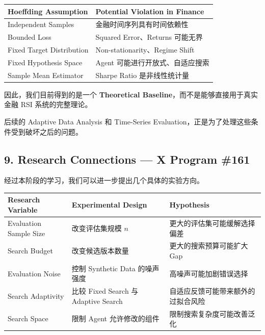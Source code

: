 \begin{readertable}
\begin{longtable}[]{@{}
  >{\raggedright\arraybackslash}p{}
  >{\raggedright\arraybackslash}p{}@{}}
\toprule
Hoeffding Assumption & Potential Violation in Finance \\
\midrule
\endhead
Independent Samples & 金融时间序列具有时间依赖性 \\
Bounded Loss & Squared Error、Returns 可能无界 \\
Fixed Target Distribution & Non-stationarity、Regime Shift \\
Fixed Hypothesis Space & Agent 可能进行开放式、自适应搜索 \\
Sample Mean Estimator & Sharpe Ratio 是非线性统计量 \\
\bottomrule
\end{longtable}
\end{readertable}

因此，我们目前得到的是一个 \textbf{Theoretical Baseline}，而不是能够直接用于真实金融 RSI 系统的完整理论。

后续的 Adaptive Data Analysis 和 Time-Series Evaluation，正是为了处理这些条件受到破坏之后的问题。

\hypertarget{part-2-14-0001-research-connections-x-program-161}{%
\subsection{9. Research Connections --- X Program \#161}\label{part-2-14-0001-research-connections-x-program-161}}

经过本阶段的学习，我们可以进一步提出几个具体的实验方向。

\begin{readertable}
\begin{longtable}[]{@{}
  >{\raggedright\arraybackslash}p{}
  >{\raggedright\arraybackslash}p{}
  >{\raggedright\arraybackslash}p{}@{}}
\toprule
Research Variable & Experimental Design & Hypothesis \\
\midrule
\endhead
Evaluation Sample Size & 改变评估集规模 \(n\) & 更大的评估集可能缓解选择偏差 \\
Search Budget & 改变候选版本数量 & 更大的搜索预算可能扩大 Gap \\
Evaluation Noise & 控制 Synthetic Data 的噪声强度 & 高噪声可能加剧错误选择 \\
Search Adaptivity & 比较 Fixed Search 与 Adaptive Search & 自适应反馈可能带来额外的过拟合风险 \\
Search Space & 限制 Agent 允许修改的组件 & 限制搜索复杂度可能改善泛化 \\
\bottomrule
\end{longtable}
\end{readertable}

